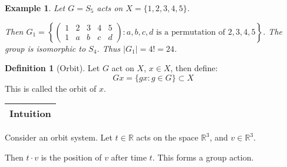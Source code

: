 \documentclass{article}
\theoremstyle{MyNonumberplain}
\theoremstyle{break}
\theoremstyle{break}
\newtheorem{example}{Example}[section]
\theoremstyle{break}
\theoremstyle{definition}
\theoremstyle{break}
\newtheorem{definition}{Definition}[section]
\begin{document}
\begin{expbox}
    \begin{example}
        Let $G = S_5$ acts on $X = \{ 1, 2, 3, 4, 5 \}$.\bigskip

        Then $G_1 = \left\{ \left(\begin{array}{ccccc}
        1 & 2 & 3 & 4 & 5\\
        1 & a & b & c & d
        \end{array}\right) : a, b, c, d \text{ is a permutation of } 2, 3, 4, 5
        \right\}$. The group is isomorphic to $S_4$. Thus $| G_1 | = 4! = 24$.
    \end{example}
\end{expbox}

\begin{defbox}
    \begin{definition}[Orbit]
        Let $G$ act on $X$, $x \in X$, then define:
        \[ G x = \{ g x : g \in G \} \subset X \]
This is called the orbit of $x$.
    \end{definition}
\end{defbox}

\begin{tabular}{|c|}
    \hline
    Intuition\\
    \hline
  \end{tabular}
  
  Consider an orbit system. Let $t \in \mathbb{R}$ acts on the space
  $\mathbb{R}^3$, and $v \in \mathbb{R}^3$.
  
  Then $t \cdot v$ is the position of $v$ after time $t$. This forms a group
  action.
\end{document}

